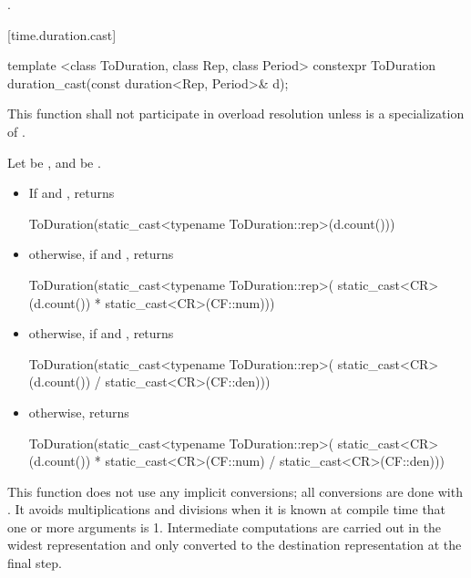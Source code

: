 \begin{itemdescr}
\pnum
\returns {}.
\end{itemdescr}

[time.duration.cast]{}

%
%
\begin{itemdecl}
template <class ToDuration, class Rep, class Period>
  constexpr ToDuration duration_cast(const duration<Rep, Period>& d);
\end{itemdecl}

\begin{itemdescr}
\pnum
\remarks This function shall not participate in overload resolution
unless  is a specialization of .

\pnum
\returns Let  be , and  be .
\begin{itemize}
\item If  and , returns
\begin{codeblock}
ToDuration(static_cast<typename ToDuration::rep>(d.count()))
\end{codeblock}

\item otherwise, if  and , returns
\begin{codeblock}
ToDuration(static_cast<typename ToDuration::rep>(
  static_cast<CR>(d.count()) * static_cast<CR>(CF::num)))
\end{codeblock}

\item otherwise, if  and , returns
\begin{codeblock}
ToDuration(static_cast<typename ToDuration::rep>(
  static_cast<CR>(d.count()) / static_cast<CR>(CF::den)))
\end{codeblock}

\item otherwise, returns
\begin{codeblock}
ToDuration(static_cast<typename ToDuration::rep>(
  static_cast<CR>(d.count()) * static_cast<CR>(CF::num) / static_cast<CR>(CF::den)))
\end{codeblock}
\end{itemize}

\pnum
\begin{note}
This function does not use any implicit conversions; all conversions
are done with . It avoids multiplications and divisions when
it is known at compile time that one or more arguments is 1. Intermediate
computations are carried out in the widest representation and only converted to
the destination representation at the final step.
\end{note}
\end{itemdescr}

